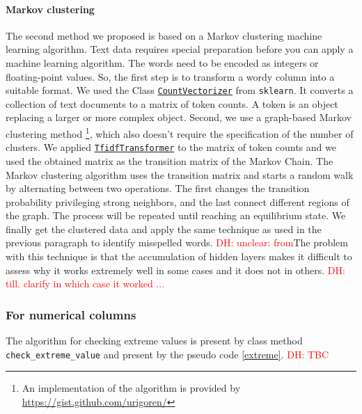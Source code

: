 \documentclass{article}
\newcommand\dhawat[1]{\textcolor{red}{DH: #1}}
\begin{document}
\paragraph{Markov clustering}
The second method we proposed is based on a Markov clustering machine learning algorithm.
Text data requires special preparation before you can apply a machine learning algorithm.
The words need to be encoded as integers or floating-point values.
So, the first step is to transform a wordy column into a suitable format.
We used the Class \href{https://scikit-learn.org/stable/modules/generated/sklearn.feature_extraction.text.CountVectorizer.html}{\texttt{CountVectorizer}} from \texttt{sklearn}.
It converts a collection of text documents to a matrix of token counts.
A token is an object replacing a larger or more complex object.
Second, we use a graph-based Markov clustering method \footnote{An implementation of the algorithm is provided by \href{https://gist.github.com/urigoren/1f76567f3af56ed8c33f076537768a60}{https://gist.github.com/urigoren/}}, which also doesn't require the specification of the number of clusters.
We applied \href{https://scikit-learn.org/stable/modules/generated/sklearn.feature_extraction.text.TfidfTransformer.html}{\texttt{TfidfTransformer}} to the matrix of token counts and we used the obtained matrix as the transition matrix of the Markov Chain.
The Markov clustering algorithm uses the transition matrix and starts a random walk by alternating between two operations.
The first changes the transition probability privileging strong neighbors, and the last connect different regions of the graph.
The process will be repeated until reaching an equilibrium state.
We finally get the clustered data and apply the same technique as used in the previous paragraph to identify misspelled words.
\dhawat{unclear: from}The problem with this technique is that the accumulation of hidden layers makes it difficult to assess why it works extremely well in some cases and it does not in others. \dhawat{till. clarify in which case it worked ...}
\subsubsection{For numerical columns} %
\label{ssub:For numerical columns}
The algorithm for checking extreme values is present by class method \texttt{check\_extreme\_value}  and present by the pseudo code \ref{extreme}.
\dhawat{TBC}
\end{document}
